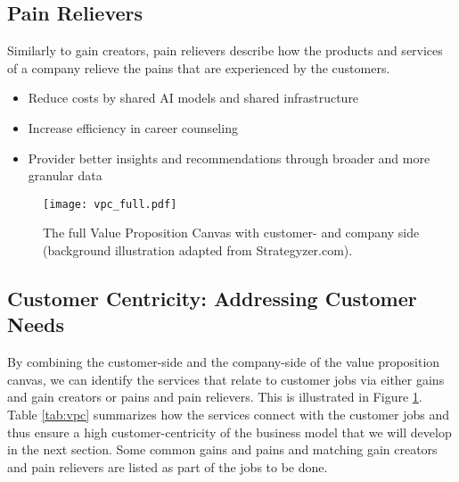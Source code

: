 \subsection{Pain Relievers}

Similarly to gain creators, pain relievers describe how the products and services of a company relieve
the pains that are experienced by the customers.

\begin{itemize}
    \item Reduce costs by shared AI models and shared infrastructure
    \item Increase efficiency in career counseling 
    \item Provider better insights and recommendations through broader and more granular data
\end{itemize}

\begin{figure}[h!]
    \centering
    \caption{The full Value Proposition Canvas with customer- and company side (background illustration adapted from Strategyzer.com).}
    \label{fig:vpc_full}
    \texttt{[image: vpc\_full.pdf]}
\end{figure}

\subsection{Customer Centricity: Addressing Customer Needs}

By combining the customer-side and the company-side of the value proposition canvas, we can identify
the services that relate to customer jobs via either gains and gain creators or pains and pain relievers.
This is illustrated in Figure \ref{fig:vpc_full}. Table \ref{tab:vpc} summarizes how the services connect
with the customer jobs and thus ensure a high customer-centricity of the business model that we will develop
in the next section. Some common gains and pains and matching gain creators and pain relievers are listed as 
part of the jobs to be done.

